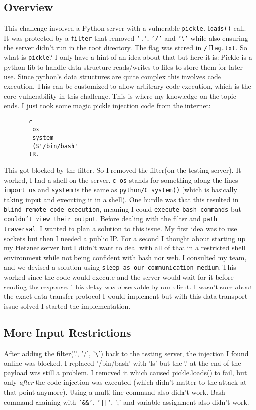\documentclass{article}
\begin{document}
\subsection{Overview}
This challenge involved a Python server with a vulnerable \texttt{pickle.loads()} call. It was protected by a \texttt{filter} that removed \texttt{'.'}, \texttt{'/'} and \texttt{'\textbackslash{}'} while also ensuring the server didn't run in the root directory.
The flag was stored in \texttt{/flag.txt}.
\newline
So what is \texttt{pickle}? I only have a hint of an idea about that but here it is:
Pickle is a python lib to handle data structure reads/writes to files to store them for later use. Since python's data structures are quite complex this involves code execution. This can be customized to allow arbitrary code execution, which is the core vulnerability in this challenge. This is where my knowledge on the topic ends. I just took some \href{https://stackoverflow.com/questions/10282175/attacking-pythons-pickle}{magic pickle injection code} from the internet:
\begin{lstlisting}
       c
        os  
        system
        (S'/bin/bash'
       tR.
\end{lstlisting}
This got blocked by the filter. So I removed the filter(on the testing server). It worked, I had a shell on the server. \texttt{c os} stands for something along the lines \texttt{import os} and \texttt{system} is the same as \texttt{python/C system()} (which is basically taking input and executing it in a shell). One hurdle was that this resulted in \texttt{blind remote code execution}, meaning I could \texttt{execute bash commands} but \texttt{couldn't view their output}. Before dealing with the filter and \texttt{path traversal}, I wanted to plan a solution to this issue. My first idea was to use sockets but then I needed a public IP. For a second I thought about starting up my Hetzner server but I didn't want to deal with all of that in a restricted shell environment while not being confident with bash nor web. I consulted my team, and we devised a solution using \texttt{sleep as our communication medium}. This worked since the code would execute and the server would wait for it before sending the response. This delay was observable by our client.
I wasn't sure about the exact data transfer protocol I would implement but with this data transport issue solved I started the implementation.


\subsection{More Input Restrictions}
After adding the filter('.', '/', '\texttt{\textbackslash{}}') back to the testing server, the injection I found online was blocked. I replaced '/bin/bash' with 'ls' but the '.' at the end of the payload was still a problem. I removed it which caused pickle.loads() to fail, but only \textit{after} the code injection was executed (which didn't matter to the attack at that point anymore). Using a multi-line command also didn't work. Bash command chaining with \texttt{'\&\&'}, \texttt{'||'}, ';' and variable assignment also didn't work.
\end{document}

